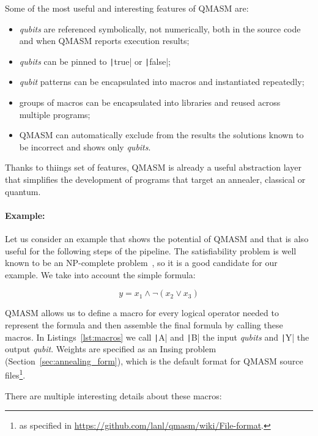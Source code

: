 Some of the most useful and interesting features of QMASM are:
\begin{itemize}
	\item \emph{qubits} are referenced symbolically, not numerically, both in the source code and when QMASM reports execution results;
	\item \emph{qubits} can be pinned to \texttt|true| or \texttt|false|;
	\item \emph{qubit} patterns can be encapsulated into macros and instantiated repeatedly;
	\item groups of macros can be encapsulated into libraries and reused across multiple programs;
	\item QMASM can automatically exclude from the results the solutions known to be incorrect and shows only  \emph{qubits}.
\end{itemize}

Thanks to thiings set of features, QMASM is already a useful abstraction layer that simplifies the development of programs that target an annealer, classical or quantum.

\paragraph{Example:} Let us consider an example that shows the potential of QMASM and that is also useful for the following steps of the pipeline. The satisfiability problem is well known to be an NP-complete problem~\cite{garey2002computers}, so it is a good candidate for our example. We take into account the simple formula:

\begin{equation}
	y = x_1 \land \neg(x_2 \lor x_3)
	\label{eqn:simple_logic}
\end{equation}

QMASM allows us to define a macro for every logical operator needed to represent the formula and then assemble the final formula by calling these macros. In Listings~\ref{lst:macros} we call \texttt|A| and \texttt|B| the input \emph{qubits} and \texttt|Y| the output \emph{qubit}. Weights are specified as an Insing problem (Section~\ref{sec:annealing_form}), which is the default format for QMASM source files\footnote{as specified in \url{https://github.com/lanl/qmasm/wiki/File-format}.}.

There are multiple interesting details about these macros:

